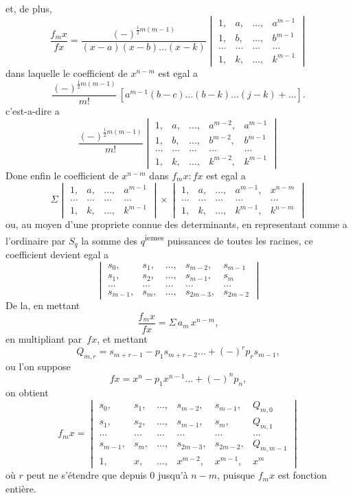 \documentclass[11pt,a4paper]{book}
\begin{document}
\newpage
et, de plus,
\[
\frac{f_m x}{fx} = \frac{(-)^{\frac{1}{2}m(m-1)}}{(x-a)(x-b)\ldots(x-k)} \begin{vmatrix}
1, & a, & \ldots, & a^{m-1}\\
1, & b, & \ldots, & b^{m-1}\\
\ldots & \ldots & \ldots & \ldots\\
1, & k, & \ldots, & k^{m-1}
\end{vmatrix}
\]
dans laquelle le coefficient de $x^{n-m}$ est egal a
\[
\frac{(-)^{\frac{1}{2}m(m-1)}}{m!}\,[a^{m-1}(b-c)\ldots(b-k)\ldots(j-k) + \ldots].
\]
c'est-a-dire a
\[
\frac{(-)^{\frac{1}{2}m(m-1)}}{m!} \begin{vmatrix}
1, & a, & \ldots, & a^{m-2}, & a^{m-1}\\
1, & b, & \ldots, & b^{m-2}, & b^{m-1}\\
\ldots & \ldots & \ldots & \ldots & \ldots\\
1, & k, & \ldots, & k^{m-2}, & k^{m-1}
\end{vmatrix}
\]
Done enfin le coefficient de $x^{n-m}$ dans $f_m x : fx$ est egal a
\[
\Sigma \begin{vmatrix}
1, & a, & \ldots, & a^{m-1}\\
\ldots & \ldots & \ldots & \ldots\\
1, & k, & \ldots, & k^{m-1}
\end{vmatrix} \times \begin{vmatrix}
1, & a, & \ldots, & a^{m-1}, & x^{n-m}\\
\ldots & \ldots & \ldots & \ldots & \ldots\\
1, & k, & \ldots, & k^{m-1}, & k^{n-m}
\end{vmatrix}
\]
ou, au moyen d'une propriete connue des determinants, en representant comme a l'ordinaire par $S_q$ la somme des $q$\textsuperscript{iemes} puissances de toutes les racines, ce coefficient devient egal a
\[
\begin{vmatrix}
s_0, & s_1, & \ldots, & s_{m-2}, & s_{m-1}\\
s_1, & s_2, & \ldots, & s_{m-1}, & s_m\\
\ldots & \ldots & \ldots & \ldots & \ldots\\
s_{m-1}, & s_m, & \ldots, & s_{2m-3}, & s_{2m-2}
\end{vmatrix}
\]
De la, en mettant
\[
\frac{f_m x}{fx} = \Sigma \, a_m \, x^{n-m},
\]
en multipliant par~$fx$, et mettant
\[
Q_{m,r} = s_{m+r-1} - p_1 s_{m+r-2} \ldots + (-)^r p_r s_{m-1},
\]
ou l'on suppose
\[
fx = x^n - p_1 x^{n-1} \ldots + (-)^n p_n,
\]
on obtient
\[
f_m x = \begin{vmatrix}
s_0, & s_1, & \ldots, & s_{m-2}, & s_{m-1}, & Q_{m,0}\\
s_1, & s_2, & \ldots, & s_{m-1}, & s_m, & Q_{m,1}\\
\ldots & \ldots & \ldots & \ldots & \ldots & \ldots\\
s_{m-1}, & s_m, & \ldots, & s_{2m-3}, & s_{2m-2}, & Q_{m,m-1}\\
1, & x, & \ldots, & x^{m-2}, & x^{m-1}, & x^m
\end{vmatrix}
\]
o\`u $r$ peut ne s'\'etendre que depuis $0$ jusqu'\`a $n-m$, puisque $f_m x$ est fonction enti\`ere.
\end{document}
